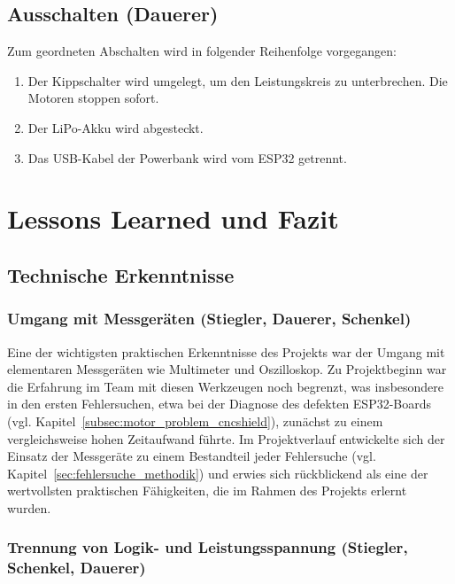 \documentclass[fontsize=12pt,
parskip=half,	%
department=FakM,  %
logostyle=flat,
twoside, %
DIV=15,BCOR=10mm, %
]{OTHRreprt}
\begin{document}
\section{Ausschalten (Dauerer)}
\label{sec:inbetrieb_ausschalten}

Zum geordneten Abschalten wird in folgender Reihenfolge vorgegangen:

\begin{enumerate}
    \item Der Kippschalter wird umgelegt, um den Leistungskreis zu unterbrechen. Die Motoren stoppen sofort.
    \item Der LiPo-Akku wird abgesteckt.
    \item Das USB-Kabel der Powerbank wird vom ESP32 getrennt.
\end{enumerate}

\chapter{Lessons Learned und Fazit}
\label{ch:lessons_learned}

\section{Technische Erkenntnisse}
\label{sec:technische_erkenntnisse}

\subsection{Umgang mit Messgeräten (Stiegler, Dauerer, Schenkel)}
\label{subsec:lessons_messtechnik}

Eine der wichtigsten praktischen Erkenntnisse des Projekts war der Umgang mit elementaren Messgeräten wie Multimeter und Oszilloskop. Zu Projektbeginn war die Erfahrung im Team mit diesen Werkzeugen noch begrenzt, was insbesondere in den ersten Fehlersuchen, etwa bei der Diagnose des defekten ESP32-Boards (vgl. Kapitel~\ref{subsec:motor_problem_cncshield}), zunächst zu einem vergleichsweise hohen Zeitaufwand führte. Im Projektverlauf entwickelte sich der Einsatz der Messgeräte zu einem Bestandteil jeder Fehlersuche (vgl. Kapitel~\ref{sec:fehlersuche_methodik}) und erwies sich rückblickend als eine der wertvollsten praktischen Fähigkeiten, die im Rahmen des Projekts erlernt wurden.

\subsection{Trennung von Logik- und Leistungsspannung (Stiegler, Schenkel, Dauerer)}
\label{subsec:lessons_spannungstrennung}
\end{document}
